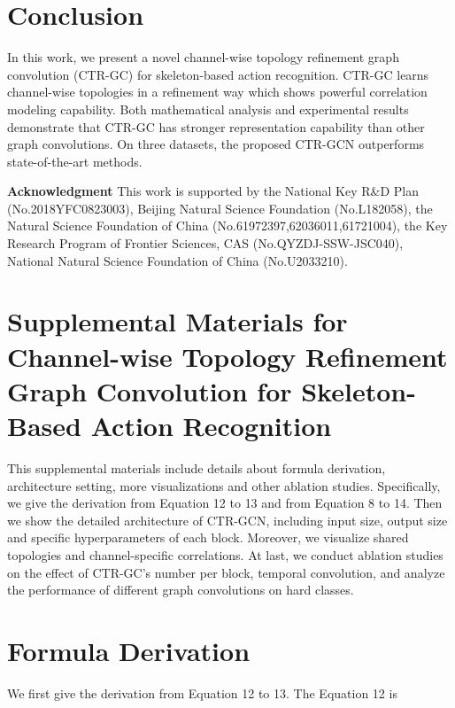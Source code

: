 \documentclass[10pt,twocolumn,letterpaper]{article}
\begin{document}
\section{Conclusion}
In this work, we present a novel channel-wise topology refinement graph convolution (CTR-GC) for skeleton-based action recognition. CTR-GC learns channel-wise topologies in a refinement way which shows powerful correlation modeling capability. Both mathematical analysis and experimental results demonstrate that CTR-GC has stronger representation capability than other graph convolutions. On three datasets, the proposed CTR-GCN outperforms state-of-the-art methods.

\noindent\textbf{Acknowledgment} This work is supported by the National Key R\&D Plan (No.2018YFC0823003), Beijing Natural Science Foundation (No.L182058), the Natural Science Foundation of China (No.61972397,62036011,61721004), the Key Research Program of Frontier Sciences, CAS (No.QYZDJ-SSW-JSC040),  National Natural Science Foundation of China (No.U2033210).

{\small


}

\clearpage
\section*{Supplemental Materials for Channel-wise Topology Refinement Graph Convolution for Skeleton-Based Action Recognition}  

\thispagestyle{empty}


This supplemental materials include details about formula derivation, architecture setting, more visualizations and other ablation studies. Specifically, we give the derivation from Equation {\color{blue}12} to {\color{blue}13} and from Equation {\color{blue}8} to {\color{blue}14}. Then we show the detailed architecture of CTR-GCN, including input size, output size and specific hyperparameters of each block. Moreover, we visualize shared topologies and channel-specific correlations. At last, we conduct ablation studies on the effect of CTR-GC's number per block, temporal convolution, and analyze the performance of different graph convolutions on hard classes.

\section*{Formula Derivation}

We first give the derivation from Equation {\color{blue}12} to {\color{blue}13}. The Equation {\color{blue}12} is
\vspace{-0.16cm}
\end{document}
